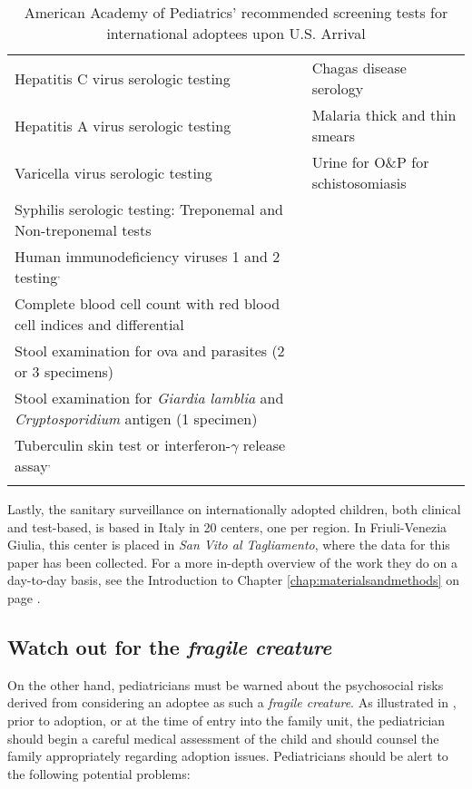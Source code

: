 \begin{footnotesize}
\begin{longtable}{p{0.5\mylength} p{0.5\mylength}}
	      Hepatitis C virus serologic testing\footnotemark[3] & Chagas disease serology\\
	      Hepatitis A virus serologic testing & Malaria thick and thin smears\\
	      Varicella virus serologic testing & Urine for O\&P for schistosomiasis\footnotemark[4]\\
	      Syphilis serologic testing: Treponemal and Non-treponemal tests & \\
	      Human immunodeficiency viruses 1 and 2 testing\footnotemark[3]$^{,}$\footnotemark[5] & \\
	      Complete blood cell count with red blood cell indices and differential & \\
	      Stool examination for ova and parasites (2 or 3 specimens) & \\
	      Stool examination for \textit{Giardia lamblia} and \textit{Cryptosporidium} antigen (1 specimen) & \\
	      Tuberculin skin test or interferon-$\gamma$ release assay\footnotemark[3]$^{,}$\footnotemark[6] & \\
	   \caption{American Academy of Pediatrics' recommended screening tests for international adoptees upon U.S. Arrival}
	    \label{tab:AAPrecscreening}
	\end{longtable}
\end{footnotesize}


Lastly, the sanitary surveillance on internationally adopted children, both clinical and test-based, is based in Italy in 20 centers, one per region. In Friuli-Venezia Giulia, this center is placed in \textit{San Vito al Tagliamento}, where the data for this paper has been collected. For a more in-depth overview of the work they do on a day-to-day basis, see the Introduction to Chapter \ref{chap:materialsandmethods} on page \pageref{chap:materialsandmethods}.

\subsection{Watch out for the \textit{fragile creature}}
On the other hand, pediatricians must be warned about the psychosocial risks derived from considering an adoptee as such a \textit{fragile creature}. As illustrated in \cite{initialeval}, prior to adoption, or at the time of entry into the family unit, the pediatrician should begin a careful medical assessment of the child and should counsel the family appropriately regarding adoption issues. Pediatricians should be alert to the following potential problems:

